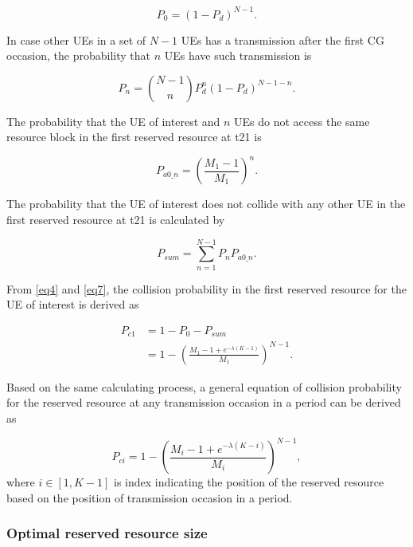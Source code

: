 \documentclass{ieeeaccess}
\begin{document}
\begin{equation}
P_{0} = (1-P_{d})^{N-1}.\label{eq4}
\end{equation}

In case other UEs in a set of $N-1$ UEs has a transmission after the first CG occasion, the probability that $n$  UEs have such transmission is 

\begin{equation}
P_{n} = \binom {N-1}{n}P_{d}^{n}(1-P_{d})^{N-1-n}.\label{eq5}
\end{equation}

The probability that the UE of interest and $n$ UEs do not access the same resource block in the first reserved resource at t21 is 

\begin{equation}
P_{a0\_n} = (\frac {M_{1}-1}{M_{1}})^{n}.\label{eq6}
\end{equation}

The probability that the UE of interest does not collide with any other UE in the first reserved resource at t21 is calculated by 

\begin{equation}
P_{sum} = \sum_{n=1}^{N-1} P_{n}P_{a0\_n}.\label{eq7}
\end{equation}

From \eqref{eq4} and \eqref{eq7}, the collision probability in the first reserved resource for the UE of interest is derived as 

\begin{align}
P_{c1} &= 1 - P_{0} - P_{sum} \nonumber\\
 &= 1 - (\frac{M_{1}-1+e^{-\lambda(K-1)}}{M_{1}})^{N-1}.\label{eq8}
\end{align}

Based on the same calculating process, a general equation of collision probability for the reserved resource at any transmission occasion in a period can be derived as 

\begin{equation}
P_{ci} = 1 - (\frac{M_{i}-1+e^{-\lambda(K-i)}}{M_{i}})^{N-1},\label{eq9}
\end{equation}
where
$i \in [1, K-1]$ is index indicating the position of the reserved resource based on the position of transmission occasion in a period.

\subsubsection{Optimal reserved resource size}
\end{document}
